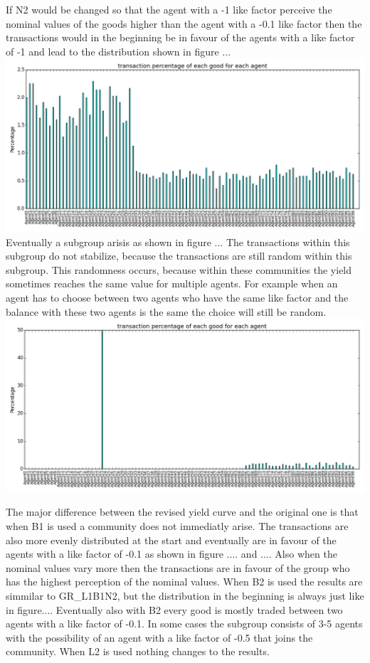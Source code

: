 \documentclass[twoside,openright]{uva-bachelor-thesis}
\begin{document}
\begin{description}
If N2 would be changed so that the agent with a -1 like factor perceive the nominal values of the goods higher than the agent with a -0.1 like factor then the transactions would in the beginning be in favour of the agents with a like factor of -1 and lead to the distribution shown in figure ...  \\
\includegraphics[scale=0.4]{GR_L1B2N2/3k_1good_b1n3} \\
Eventually a subgroup arisis as shown in figure ... The transactions within this subgroup do not stabilize, because the transactions are still random within this subgroup. This randomness occurs, because within these communities the yield sometimes reaches the same value for multiple agents. For example when an agent has to choose between two agents who have the same like factor and the balance with these two agents is the same the choice will still be random.\\
\includegraphics[scale=0.4]{GR_L1B2N2/5k_1good_b1n3subgroup}
\end{description}
The major difference between the revised yield curve and the original one is that when B1 is used a community does not immediatly arise. The transactions are also more evenly distributed at the start and eventually are in favour of the agents with a like factor of -0.1 as shown in figure .... and .... Also when the nominal values vary more then the transactions are in favour of the group who has the highest perception of the nominal values.
When B2 is used the results are simmilar to GR\_L1B1N2, but the distribution in the beginning is always just like in figure.... Eventually also with B2 every good is mostly traded  between two agents with a like factor of -0.1. In some cases the subgroup consists of 3-5 agents with the possibility of an agent with a like factor of -0.5 that joins the community. When L2 is used nothing changes to the results.
\end{document}
